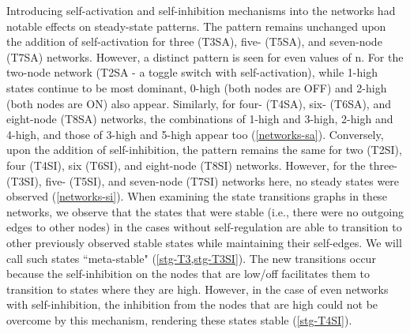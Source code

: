 \documentclass[11pt,a4paper]{article}
\theoremstyle{definition}
\theoremstyle{remark}
\begin{document}
Introducing self-activation and self-inhibition mechanisms into the networks had notable effects on steady-state patterns. The pattern remains unchanged  upon the addition of self-activation for three (T3SA), five- (T5SA), and seven-node (T7SA) networks. However, a distinct pattern is seen for even values of n. For the two-node network (T2SA - a toggle switch with self-activation), while 1-high states continue to be most dominant, 0-high (both nodes are OFF) and 2-high (both nodes are ON) also appear. Similarly, for four- (T4SA), six- (T6SA), and eight-node (T8SA) networks, the combinations of 1-high and 3-high, 2-high and 4-high, and those of 3-high and 5-high appear too (\cref{networks-sa}). Conversely, upon the addition of self-inhibition, the pattern remains the same for two (T2SI), four (T4SI), six (T6SI), and eight-node (T8SI) networks. However, for the three- (T3SI), five- (T5SI), and seven-node (T7SI) networks here, no steady states were observed (\cref{networks-si}). When examining the state transitions graphs in these networks, we observe that the states that were stable (i.e., there were no outgoing edges to other nodes) in the cases without self-regulation are able to transition to other previously observed stable states while maintaining their self-edges. We will call such states ``meta-stable" (\cref{stg-T3,stg-T3SI}). The new transitions occur because the self-inhibition on the nodes that are low/off facilitates them to transition to states where they are high. However, in the case of even networks with self-inhibition, the inhibition from the nodes that are high could not be overcome by this mechanism, rendering these states stable (\cref{stg-T4SI}).
\end{document}
